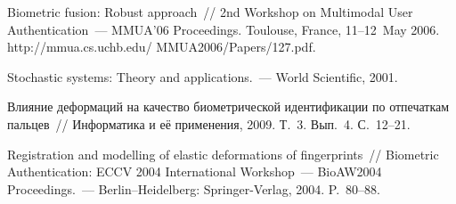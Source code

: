 \begin{multicols}{2}
{{\begin{thebibliography}{99}
Biometric fusion: Robust approach~// 2nd Workshop on Multimodal User 
Authentication~--- MMUA'06 Proceedings.  Toulouse, France, 11--12~May 2006. {\sf  
http://mmua.cs.uchb.edu/ MMUA2006/Papers/127.pdf}.

Stochastic systems: Theory and applications.~--- World Scientific, 2001.

\label{end\stat}

Влияние деформаций на качество биометрической идентификации по отпечаткам 
пальцев~// Информатика и её применения, 2009. Т.~3. Вып.~4. С.~12--21.



Registration and modelling of elastic deformations of fingerprints~// Biometric 
Authentication: ECCV 2004 International Workshop~--- BioAW2004 Proceedings.~--- 
Berlin--Heidelberg: Springer-Verlag, 2004. 
P.~80--88.
 \end{thebibliography}
}
}
\end{multicols}